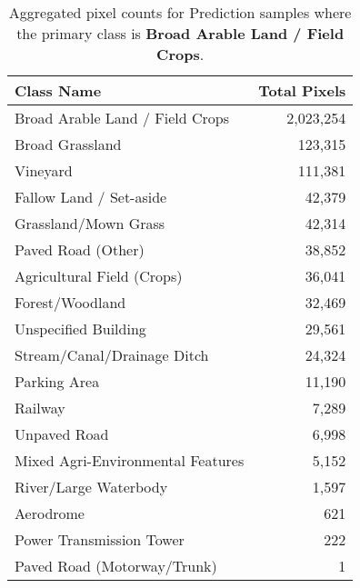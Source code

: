 \begin{table}[H] %
    \centering
    \caption{Aggregated pixel counts for Prediction samples where the primary class is \textbf{Broad Arable Land / Field Crops}.}
    \label{tab:pred_counts_35}
    \begin{tabular}{lr}
        \hline
        \textbf{Class Name} & \textbf{Total Pixels} \\
        \hline
        Broad Arable Land / Field Crops & 2,023,254 \\
        Broad Grassland & 123,315 \\
        Vineyard & 111,381 \\
        Fallow Land / Set-aside & 42,379 \\
        Grassland/Mown Grass & 42,314 \\
        Paved Road (Other) & 38,852 \\
        Agricultural Field (Crops) & 36,041 \\
        Forest/Woodland & 32,469 \\
        Unspecified Building & 29,561 \\
        Stream/Canal/Drainage Ditch & 24,324 \\
        Parking Area & 11,190 \\
        Railway & 7,289 \\
        Unpaved Road & 6,998 \\
        Mixed Agri-Environmental Features & 5,152 \\
        River/Large Waterbody & 1,597 \\
        Aerodrome & 621 \\
        Power Transmission Tower & 222 \\
        Paved Road (Motorway/Trunk) & 1 \\
        \hline
    \end{tabular}
\end{table}


